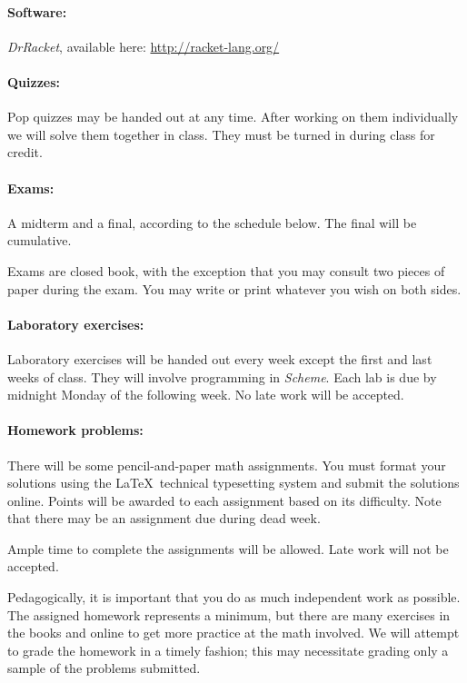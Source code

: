 \documentclass{article}
\begin{document}
\paragraph{Software:} {\em DrRacket}, available here: 
\url{http://racket-lang.org/}

\paragraph{Quizzes:}  
Pop quizzes may be handed out at any time.  After working
on them individually we will solve them together in class.
They must be turned in during class for credit.

\paragraph{Exams:} A midterm and a final, according to the schedule below.
The final will be cumulative.

Exams are closed book, with the exception that you may
consult two pieces of paper during the exam.  You may write or print
whatever you wish on both sides.

\paragraph{Laboratory exercises:}
Laboratory exercises will be handed out every week except
the first and last weeks of class.  They will involve
programming in {\em Scheme}.
Each lab is due by midnight Monday of the following week.
No late work will be accepted.

\paragraph{Homework problems:}
There will be some pencil-and-paper math assignments.  You must format
your solutions using the \LaTeX\ technical typesetting system and
submit the solutions online. Points will be awarded to each assignment
based on its difficulty.  Note that there may be an assignment due
during dead week.

Ample time to complete the assignments will be allowed.
Late work will not be accepted.  

Pedagogically, it is important that you do as much independent work as
possible.  The assigned homework represents a minimum, but there are
many exercises in the books and online to get more practice at the
math involved.  We will attempt to grade the homework in a timely
fashion; this may necessitate grading only a sample of the problems
submitted.
\end{document}
